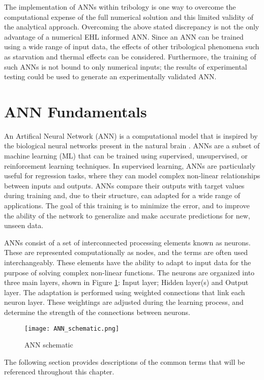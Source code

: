 The implementation of ANNs within tribology is one way to overcome the computational expense of the full numerical solution and this limited validity of the analytical approach. Overcoming the above stated discrepancy is not the only advantage of a numerical EHL informed ANN. Since an ANN can be trained using a wide range of input data, the effects of other tribological phenomena such as starvation and thermal effects can be considered. Furthermore, the training of such ANNs is not bound to only numerical inputs; the results of experimental testing could be used to generate an experimentally validated ANN.

\section{ANN Fundamentals}

An Artifical Neural Network (ANN) is a computational model that is inspired by the biological neural networks present in the natural brain \cite{Sarkar2017}. ANNs are a subset of machine learning (ML) that can be trained using supervised, unsupervised, or reinforcement learning techniques. In supervised learning, ANNs are particularly useful for regression tasks, where they can model complex non-linear relationships between inputs and outputs. ANNs compare their outputs with target values during training and, due to their structure, can adapted for a wide range of applications. The goal of this training is to minimize the error, and to improve the ability of the network to generalize and make accurate predictions for new, unseen data.

ANNs consist of a set of interconnected processing elements known as neurons. These are represented computationally as nodes, and the terms are often used interchangeably. These elements have the ability to adapt to input data for the purpose of solving complex non-linear functions. The neurons are organized into three main layers, shown in Figure \ref{ANN schematic}: Input layer; Hidden layer(s) and Output layer. The adaptation is performed using weighted connections that link each neuron layer. These weightings are adjusted during the learning process, and determine the strength of the connections between neurons.

\begin{figure}
	\centering  
	\texttt{[image: ANN\_schematic.png]}
	\caption{ANN schematic}
	\label{ANN schematic}
\end{figure} 

The following section provides descriptions of the common terms that will be referenced throughout this chapter.

